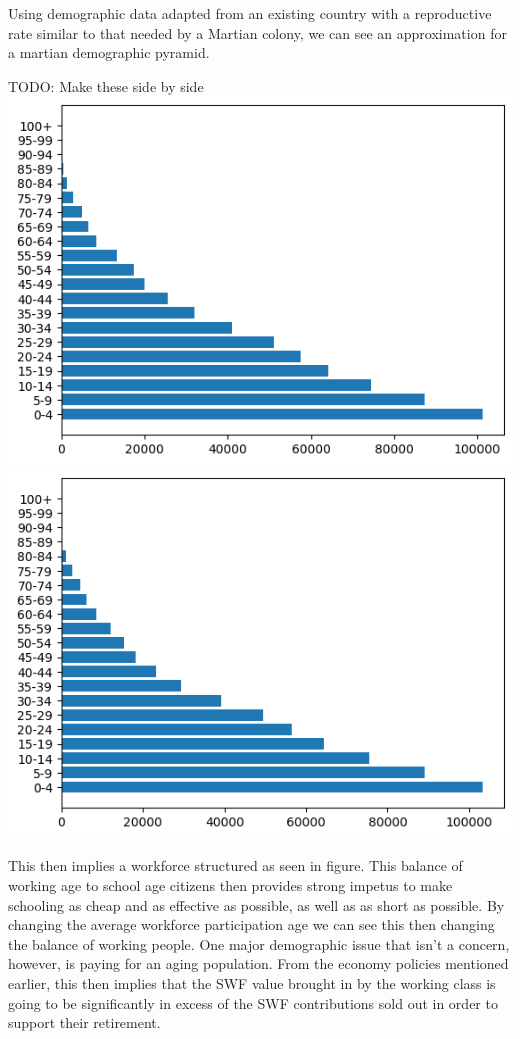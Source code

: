 \documentclass[10pt]{article}
\begin{document}
Using demographic data adapted from an existing country with a reproductive rate similar to that needed by a Martian colony, we can see an approximation for a martian demographic pyramid.

TODO: Make these side by side
\includegraphics{fig_demopyr_f.png}
\includegraphics{fig_demopyr_m.png}

This then implies a workforce structured as seen in figure. This balance of working age to school age citizens then provides strong impetus to make schooling as cheap and as effective as possible, as well as as short as possible. By changing the average workforce participation age we can see this then changing the balance of working people. One major demographic issue that isn't a concern, however, is paying for an aging population. From the economy policies mentioned earlier, this then implies that the SWF value brought in by the working class is going to be significantly in excess of the SWF contributions sold out in order to support their retirement.
\end{document}
